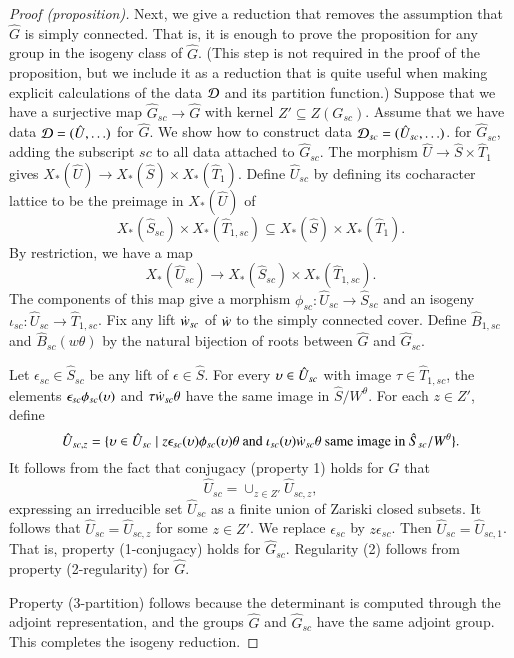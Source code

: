 \begin{proof}[Proof (proposition)]
Next, we give a reduction that removes the assumption that $\hat G$ is
simply connected.  That is, it is enough to prove the proposition for
any group in the isogeny class of $\hat G$.  (This step is not
required in the proof of the proposition, but we include it as a
reduction that is quite useful when making explicit calculations of
the data $\mathcal D$ and its partition function.)  Suppose that we have a
surjective map $\hat G_{sc}\to \hat G$ with kernel $Z' \subseteq
Z(G_{sc})$.  Assume that we have data $\mathcal D=(\hat U,\ldots)$ for $\hat
G$.  We show how to construct data $\mathcal D_{sc}=(\hat U_{sc},\ldots)$. for
$\hat G_{sc}$, adding the subscript ${sc}$ to all data attached to
$\hat G_{sc}$.  The morphism $\hat U \to \hat S\times \hat T_1$ gives
$X_*(\hat U)\to X_*(\hat S)\times X_*(\hat T_1)$.  Define $\hat
U_{sc}$ by defining its cocharacter lattice to be the preimage in
$X_*(\hat U)$ of
\[
X_*(\hat S_{sc})\times X_*(\hat T_{1, sc}) 
\subseteq X_*(\hat S)\times X_*(\hat T_1).
\] 
By restriction, we have a map
\[
X_*(\hat U_{sc})\to X_*(\hat S_{sc}) \times X_*(\hat T_{1,sc}).  
\]
The components of this map give a morphism $\phi_{sc}:\hat U_{sc}\to\hat S_{sc}$
and an isogeny $\iota_{sc}:\hat U_{sc} \to \hat T_{1,sc}$.  Fix any
lift $\dot w_{sc}$ of $\dot w$ to the simply connected cover.
Define $\hat B_{1,sc}$ and $\hat B_{sc}(w\theta)$
by the natural bijection of roots between $\hat G$ and $\hat G_{sc}$.


Let $\epsilon_{sc}\in \hat S_{sc}$ be any lift of
$\epsilon\in \hat S$.  For every $\upsilon\in \hat U_{sc}$ with image
$\tau\in \hat T_{1,sc}$, the elements $\epsilon_{sc}\phi_{sc}(\upsilon)$
and $\tau\dot w_{sc}\theta$ have the same image in $\hat S/W^\theta$.
For each $z\in Z'$, define
\[
\hat U_{sc,z} = \{\upsilon \in \hat U_{sc}\mid 
z \epsilon_{sc}(\upsilon)\phi_{sc}(\upsilon)\theta\text{ and }
\iota_{sc}(\upsilon)\dot w_{sc}\theta \text{ same image in } \hat S_{sc}/W^\theta\}.
\]
 It follows from
the fact that conjugacy (property 1) holds for $\hat G$ that
\[
\hat U_{sc} = \cup_{z\in Z'} \hat U_{sc,z},
\]
expressing an irreducible set $\hat U_{sc}$ as a finite union of
Zariski closed subsets.  It follows that $\hat U_{sc} = \hat U_{sc,z}$
for some $z\in Z'$.  We replace $\epsilon_{sc}$ by $z\epsilon_{sc}$.
Then $\hat U_{sc} = \hat U_{sc,1}$.  That is, property (1-conjugacy) holds for
$\hat G_{sc}$.  Regularity (2) follows from property (2-regularity)
for $\hat G$.

Property (3-partition) follows because the determinant
is computed through the adjoint representation,  and the groups $\hat G$
and $\hat G_{sc}$ have the same adjoint group.
This completes the isogeny reduction.


\end{proof}
